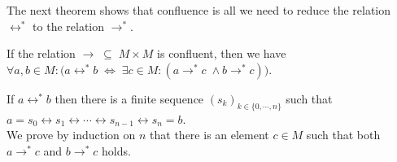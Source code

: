 The next theorem shows that confluence is all we need to reduce the relation $\leftrightarrow^*$
to the relation $\rightarrow^*$. 

\begin{Theorem}
  If the relation $\rightarrow \;\subseteq\; M \times M$ is confluent, then we have
  \\[0.2cm]
  \hspace*{1.3cm}
  $\forall a, b \in M:\bigl( a \leftrightarrow^* b \;\Leftrightarrow\;
   \exists c \in M: (a \rightarrow^* c \;\wedge b \rightarrow^* c)\bigr)$.
 \end{Theorem}

 \proof
If $a \leftrightarrow^* b$ then there is a finite sequence $(s_k)_{k\in \{0,\cdots,n\}}$ such that
\\[0.2cm]
\hspace*{1.3cm}
$a = s_0 \leftrightarrow s_1 \leftrightarrow \cdots \leftrightarrow s_{n-1} \leftrightarrow s_n = b$.
\\[0.2cm]
We prove by induction on $n$ that there is an element $c \in M$ such that both $a \rightarrow^* c$ and
$b \rightarrow^* c$ holds.
